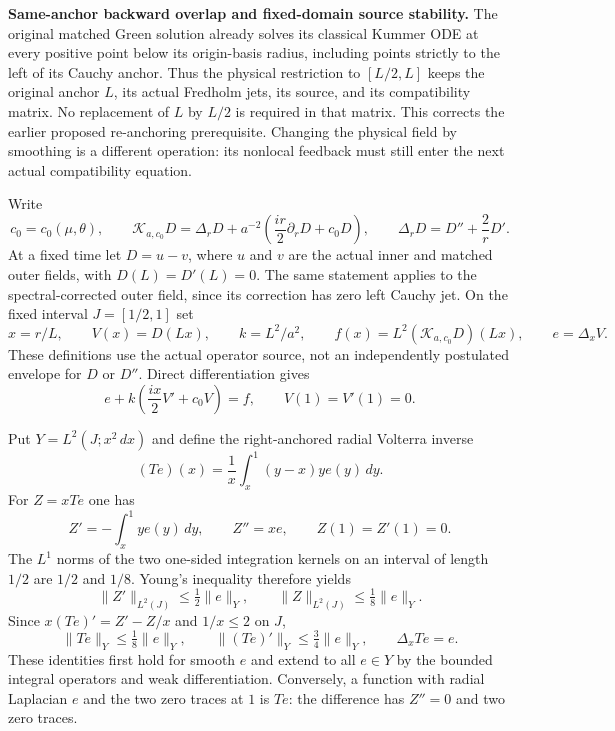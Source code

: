 
\medskip
\noindent\textbf{Same-anchor backward overlap and fixed-domain source stability.}
The original matched Green solution already solves its classical Kummer
ODE at every positive point below its origin-basis radius, including points
strictly to the left of its Cauchy anchor.  Thus the physical restriction
to $[L/2,L]$ keeps the original anchor $L$, its actual Fredholm jets,
its source, and its compatibility matrix.  No replacement of $L$ by $L/2$
is required in that matrix.  This corrects the earlier proposed
re-anchoring prerequisite.  Changing the physical field by smoothing is
a different operation: its nonlocal feedback must still enter the next
actual compatibility equation.

Write
\[
 c_0=c_0(\mu,\theta),\qquad
 \mathcal K_{a,c_0}D
 =\Delta_rD+a^{-2}\left(\frac{ir}{2}\partial_rD+c_0D\right),
 \qquad \Delta_rD=D''+\frac2rD'.
\]
At a fixed time let $D=u-v$, where $u$ and $v$ are the actual inner
and matched outer fields, with $D(L)=D'(L)=0$.  The same statement applies
to the spectral-corrected outer field, since its correction has zero
left Cauchy jet.  On the fixed interval $J=[1/2,1]$ set
\[
 x=r/L,\qquad V(x)=D(Lx),\qquad k=L^2/a^2,\qquad
 f(x)=L^2(\mathcal K_{a,c_0}D)(Lx),\qquad e=\Delta_xV.
\]
These definitions use the actual operator source, not an independently
postulated envelope for $D$ or $D''$.  Direct differentiation gives
\begin{equation}
 e+k\left(\frac{ix}{2}V'+c_0V\right)=f,
 \qquad V(1)=V'(1)=0.
 \label{eq:fixed-domain-actual-kummer}
\end{equation}

Put $Y=L^2(J;x^2\,dx)$ and define the right-anchored radial Volterra inverse
\[
 (Te)(x)=\frac1x\int_x^1(y-x)y e(y)\,dy.
\]
For $Z=xTe$ one has
\[
 Z'=-\int_x^1y e(y)\,dy,\qquad Z''=xe,
 \qquad Z(1)=Z'(1)=0.
\]
The $L^1$ norms of the two one-sided integration kernels on an interval
of length $1/2$ are $1/2$ and $1/8$.  Young's inequality therefore yields
\[
 \|Z'\|_{L^2(J)}\le\tfrac12\|e\|_Y,
 \qquad \|Z\|_{L^2(J)}\le\tfrac18\|e\|_Y.
\]
Since $x(Te)'=Z'-Z/x$ and $1/x\le2$ on $J$,
\begin{equation}
 \|Te\|_Y\le\tfrac18\|e\|_Y,
 \qquad \|(Te)'\|_Y\le\tfrac34\|e\|_Y,
 \qquad \Delta_xTe=e.
 \label{eq:fixed-domain-volterra-bounds}
\end{equation}
These identities first hold for smooth $e$ and extend to all $e\in Y$
by the bounded integral operators and weak differentiation.  Conversely,
a function with radial Laplacian $e$ and the two zero traces at $1$
is $Te$: the difference has $Z''=0$ and two zero traces.

